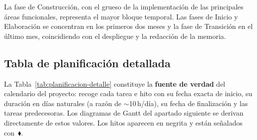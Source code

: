 \documentclass[11pt, a4paper]{article}
\begin{document}
La fase de Construcción, con el grueso de la implementación de las principales áreas funcionales, representa el mayor bloque temporal. Las fases de Inicio y Elaboración se concentran en los primeros dos meses y la fase de Transición en el último mes, coincidiendo con el despliegue y la redacción de la memoria.

\subsection{Tabla de planificación detallada}

La Tabla~\ref{tab:planificacion-detalle} constituye la \textbf{fuente de verdad} del calendario del proyecto: recoge cada tarea e hito con su fecha exacta de inicio, su duración en días naturales (a razón de $\sim$10\,h/día), su fecha de finalización y las tareas predecesoras. Los diagramas de Gantt del apartado siguiente se derivan directamente de estos valores. Los hitos aparecen en negrita y están señalados con~$\blacklozenge$.
\end{document}
